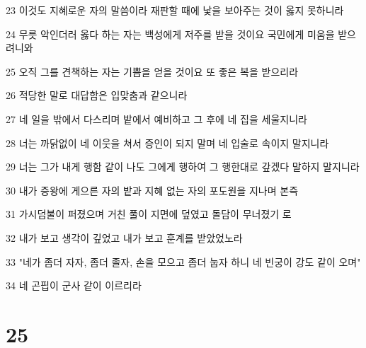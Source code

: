 \par 23 이것도 지혜로운 자의 말씀이라 재판할 때에 낯을 보아주는 것이 옳지 못하니라
\par 24 무릇 악인더러 옳다 하는 자는 백성에게 저주를 받을 것이요 국민에게 미움을 받으려니와
\par 25 오직 그를 견책하는 자는 기쁨을 얻을 것이요 또 좋은 복을 받으리라
\par 26 적당한 말로 대답함은 입맞춤과 같으니라
\par 27 네 일을 밖에서 다스리며 밭에서 예비하고 그 후에 네 집을 세울지니라
\par 28 너는 까닭없이 네 이웃을 쳐서 증인이 되지 말며 네 입술로 속이지 말지니라
\par 29 너는 그가 내게 행함 같이 나도 그에게 행하여 그 행한대로 갚겠다 말하지 말지니라
\par 30 내가 증왕에 게으른 자의 밭과 지혜 없는 자의 포도원을 지나며 본즉
\par 31 가시덤불이 퍼졌으며 거친 풀이 지면에 덮였고 돌담이 무너졌기 로
\par 32 내가 보고 생각이 깊었고 내가 보고 훈계를 받았었노라
\par 33 "네가 좀더 자자, 좀더 졸자, 손을 모으고 좀더 눕자 하니 네 빈궁이 강도 같이 오며"
\par 34 네 곤핍이 군사 같이 이르리라

\chapter{25}

